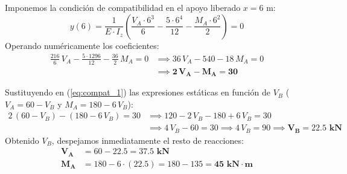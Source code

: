 {    

    Imponemos la condición de compatibilidad en el apoyo liberado $x = 6\text{ m}$:
    \begin{equation}
        y(6) = \frac{1}{E \cdot I_z}\left(\frac{V_A \cdot 6^3}{6} - \frac{5 \cdot 6^4}{12} - \frac{M_A \cdot 6^2}{2}\right) = 0
    \end{equation}
    Operando numéricamente los coeficientes:
    \begin{align}
        \frac{216}{6}\,V_A - \frac{5 \cdot 1296}{12} - \frac{36}{2}\,M_A = 0 & \implies 36\,V_A - 540 - 18\,M_A = 0 \nonumber \\
                                                                              & \implies \mathbf{2\,V_A - M_A = 30} \label{eq:compat_1}
    \end{align}

    Sustituyendo en (\ref{eq:compat_1}) las expresiones estáticas en función de $V_B$ ($V_A = 60 - V_B$ y $M_A = 180 - 6\,V_B$):
    \begin{align}
        2\,(60 - V_B) - (180 - 6\,V_B) = 30 & \implies 120 - 2\,V_B - 180 + 6\,V_B = 30 \nonumber \\
                                            & \implies 4\,V_B - 60 = 30 \implies 4\,V_B = 90 \implies \mathbf{V_B = 22.5\text{ kN}}
    \end{align}
    Obtenido $V_B$, despejamos inmediatamente el resto de reacciones:
    \begin{align}
        \mathbf{V_A} & = 60 - 22.5 = \mathbf{37.5\text{ kN}}                              \\
        \mathbf{M_A} & = 180 - 6 \cdot (22.5) = 180 - 135 = \mathbf{45\text{ kN}\cdot\text{m}}
    \end{align}

}
